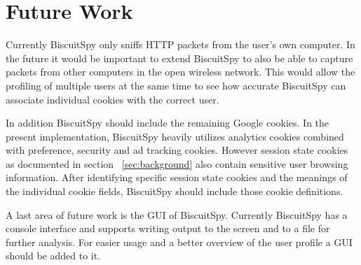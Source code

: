 \section{Future Work}
\label{sec:future}

Currently BiscuitSpy only sniffs HTTP packets from the user's own computer. In the future it would be important to extend BiscuitSpy to also be able to capture packets from other computers in the open wireless network. This would allow the profiling of multiple users at the same time to see how accurate BiscuitSpy can associate individual cookies with the correct user.

In addition BiscuitSpy should include the remaining Google cookies. In the present implementation, BiscuitSpy heavily utilizes analytics cookies combined with preference, security and ad tracking cookies. However session state cookies as documented in section ~\ref{sec:background} also contain sensitive user browsing information. After identifying specific session state cookies and the meanings of the individual cookie fields, BiscuitSpy should include those cookie definitions.

A last area of future work is the GUI of BiscuitSpy. Currently BiscuitSpy has a console interface and supports writing output to the screen and to a file for further analysis. For easier usage and a better overview of the user profile a GUI should be added to it.
